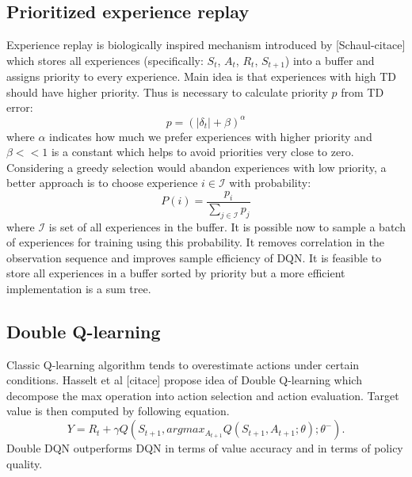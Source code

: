 \subsection{Prioritized experience replay}
Experience replay is biologically inspired mechanism introduced by [Schaul-citace] which stores all experiences (specifically: $S_t$, $A_t$, $R_{t}$, $S_{t+1}$) into a buffer and assigns priority to every experience. Main idea is that experiences with high TD should have higher priority. Thus is necessary to calculate priority $p$ from TD error:
\begin{equation}
p = (|\delta_t | + \beta)^\alpha
\end{equation}
where $\alpha$ indicates how much we prefer experiences with higher priority and $\beta << 1$ is a constant which helps to avoid priorities very close to zero. Considering a greedy selection would abandon experiences with low priority, a better approach is to choose experience $i \in \mathcal{I}$ with probability:
\begin{equation}
P(i) = \frac{p_i}{\sum_{j \in \mathcal{I}} p_j}
\end{equation}
where $\mathcal{I}$ is set of all experiences in the buffer. It is possible now to sample a batch of experiences for training using this probability. It removes correlation in the observation sequence and improves sample efficiency of DQN. It is feasible to store all experiences in a buffer sorted by priority but a more efficient implementation is a sum tree.

\subsection{Double Q-learning}
Classic Q-learning algorithm tends to overestimate actions under certain conditions. Hasselt et al [citace] propose idea of Double Q-learning which decompose the max operation into action selection and action evaluation. Target value is then computed by following equation.
\begin{equation}
Y = R_{t} + \gamma Q(S_{t+1}, argmax_{A_{t+1}}Q(S_{t+1}, A_{t+1};\theta);\theta^-).
\end{equation}
Double DQN outperforms DQN in terms of value accuracy and in terms of policy quality.

\clearpage
